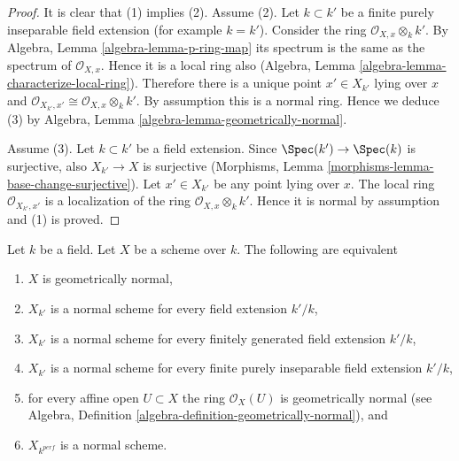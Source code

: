 \begin{proof}
It is clear that (1) implies (2). Assume (2). Let $k \subset k'$ be a finite
purely inseparable field extension (for example $k = k'$). Consider the ring
$\mathcal{O}_{X, x} \otimes_k k'$.
By Algebra, Lemma \ref{algebra-lemma-p-ring-map}
its spectrum is the same as the spectrum of $\mathcal{O}_{X, x}$.
Hence it is a local ring also
(Algebra, Lemma \ref{algebra-lemma-characterize-local-ring}).
Therefore there is a unique point $x' \in X_{k'}$ lying over $x$
and $\mathcal{O}_{X_{k'}, x'} \cong \mathcal{O}_{X, x} \otimes_k k'$.
By assumption this is a normal ring. Hence we deduce (3) by
Algebra, Lemma
\ref{algebra-lemma-geometrically-normal}.

\medskip\noindent
Assume (3). Let $k \subset k'$ be a field extension. Since
$\Spec(k') \to \Spec(k)$ is surjective, also
$X_{k'} \to X$ is surjective
(Morphisms, Lemma \ref{morphisms-lemma-base-change-surjective}).
Let $x' \in X_{k'}$ be any point lying over $x$.
The local ring $\mathcal{O}_{X_{k'}, x'}$
is a localization of the ring $\mathcal{O}_{X, x} \otimes_k k'$.
Hence it is normal by assumption and (1) is proved.
\end{proof}

\begin{lemma}
\label{lemma-geometrically-normal}
Let $k$ be a field.
Let $X$ be a scheme over $k$.
The following are equivalent
\begin{enumerate}
\item $X$ is geometrically normal,
\item $X_{k'}$ is a normal scheme for every field extension $k'/k$,
\item $X_{k'}$ is a normal scheme for every finitely generated field
extension $k'/k$,
\item $X_{k'}$ is a normal scheme for every finite purely inseparable
field extension $k'/k$,
\item for every affine open $U \subset X$ the ring $\mathcal{O}_X(U)$
is geometrically normal (see
Algebra, Definition \ref{algebra-definition-geometrically-normal}), and
\item $X_{k^{perf}}$ is a normal scheme.
\end{enumerate}
\end{lemma}


